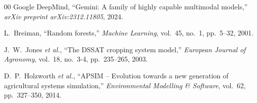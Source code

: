 \documentclass[conference]{IEEEtran}
\begin{document}
\begin{thebibliography}{00}
Google DeepMind, ``Gemini: A family of highly capable multimodal models,'' \textit{arXiv preprint arXiv:2312.11805}, 2024.

L.~Breiman, ``Random forests,'' \textit{Machine Learning}, vol.~45, no.~1, pp.~5--32, 2001.

J.~W.~Jones \textit{et al.}, ``The DSSAT cropping system model,'' \textit{European Journal of Agronomy}, vol.~18, no.~3-4, pp.~235--265, 2003.

D.~P.~Holzworth \textit{et al.}, ``APSIM -- Evolution towards a new generation of agricultural systems simulation,'' \textit{Environmental Modelling \& Software}, vol.~62, pp.~327--350, 2014.

\end{thebibliography}
\end{document}
